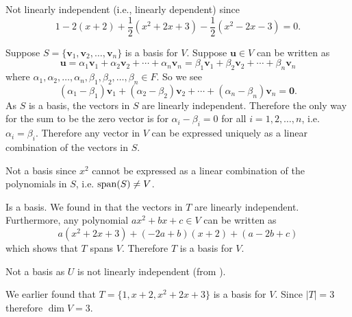 \begin{questions}
\begin{partquestions}{\alph*}
        \item Not linearly independent (i.e., linearly dependent) since
        \[
            1 - 2(x+2) + \frac12(x^2 + 2x + 3) - \frac12(x^2 - 2x - 3) = 0.
        \]
    \end{partquestions}

    \item Suppose $S = \{\mathbf{v}_1, \mathbf{v}_2, \dots, \mathbf{v}_n\}$ is a basis for $V$. Suppose $\mathbf{u} \in V$ can be written as
    \[
        \mathbf{u} = \alpha_1\mathbf{v}_1 + \alpha_2\mathbf{v}_2 + \cdots + \alpha_n\mathbf{v}_n = \beta_1\mathbf{v}_1 + \beta_2\mathbf{v}_2 + \cdots + \beta_n\mathbf{v}_n
    \]
    where $\alpha_1, \alpha_2, \dots, \alpha_n, \beta_1, \beta_2, \dots, \beta_n \in F$. So we see
    \[
        (\alpha_1 - \beta_1)\mathbf{v}_1 + (\alpha_2 - \beta_2)\mathbf{v}_2 + \cdots + (\alpha_n - \beta_n)\mathbf{v}_n = \mathbf{0}.
    \]
    As $S$ is a basis, the vectors in $S$ are linearly independent. Therefore the only way for the sum to be the zero vector is for $\alpha_i - \beta_i = 0$ for all $i = 1, 2, \dots, n$, i.e. $\alpha_i = \beta_i$. Therefore any vector in $V$ can be expressed uniquely as a linear combination of the vectors in $S$.

    \item \begin{partquestions}{\alph*}
        \item Not a basis since $x^2$ cannot be expressed as a linear combination of the polynomials in $S$, i.e. $\mathrm{span}(S) \neq V$.

        \item Is a basis. We found in  that the vectors in $T$ are linearly independent. Furthermore, any polynomial $ax^2 + bx + c \in V$ can be written as
        \[
            a(x^2+2x+3) + (-2a+b)(x+2) + (a-2b+c)
        \]
        which shows that $T$ spans $V$. Therefore $T$ is a basis for $V$.

        \item Not a basis as $U$ is not linearly independent (from ).
    \end{partquestions}

    \item We earlier found that $T = \{1, x + 2, x^2 + 2x + 3\}$ is a basis for $V$. Since $|T| = 3$ therefore $\dim{V} = 3$.
\end{questions}

